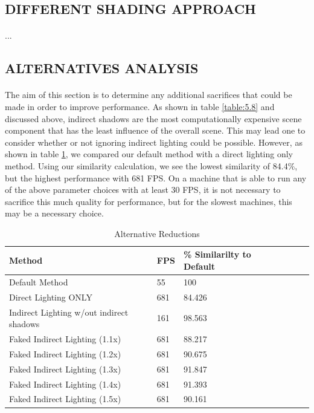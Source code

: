 \subsection{DIFFERENT SHADING APPROACH} \label{sec:newApproach}
\paragraph{}
...

\subsection{ALTERNATIVES ANALYSIS} \label{sec:alternatives}
\paragraph{}
The aim of this section is to determine any additional sacrifices that could be made in order to improve performance.  As shown in table \ref{table:5.8} and discussed above, indirect shadows are the most computationally expensive scene component that has the least influence of the overall scene.  This may lead one to consider whether or not ignoring indirect lighting could be possible.  However, as shown in table \ref{table:5.9}, we compared our default method with a direct lighting only method.  Using our similarity calculation, we see the lowest similarity of 84.4\%, but the highest performance with 681 FPS.  On a machine that is able to run any of the above parameter choices with at least 30 FPS, it is not necessary to sacrifice this much quality for performance, but for the slowest machines, this may be a necessary choice.

\begin{table}[h!]
	\caption{Alternative Reductions}
	\begin{center}
	    \begin{tabular}{ | l | l | l | l | l | l |}
	    \hline
	    Method & FPS & \% Similarilty to Default\\ \hline
	    Default Method & 55 & 100\\ \hline
	    Direct Lighting ONLY & 681 & 84.426\\ \hline
	    Indirect Lighting w/out indirect shadows & 161 & 98.563\\ \hline
	    Faked Indirect Lighting (1.1x) & 681 & 88.217\\ \hline
	    Faked Indirect Lighting (1.2x) & 681 & 90.675\\ \hline
	    Faked Indirect Lighting (1.3x) & 681 & 91.847\\ \hline
	    Faked Indirect Lighting (1.4x) & 681 & 91.393\\ \hline
	    Faked Indirect Lighting (1.5x) & 681 & 90.161\\ \hline
	    \end{tabular}
	\end{center}
	\label{table:5.9}
\end{table}

